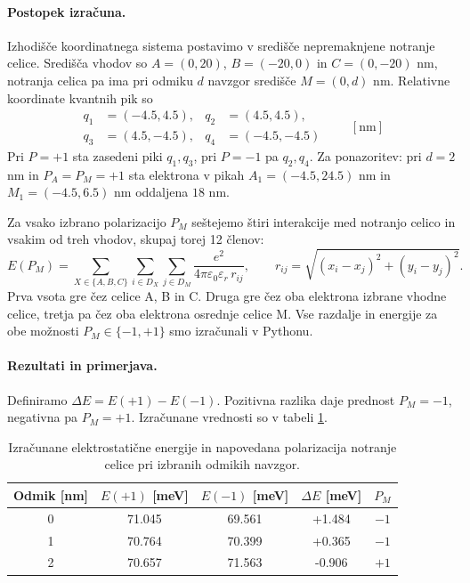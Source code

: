 \documentclass[12pt,a4paper]{article}
\begin{document}
\paragraph{Postopek izračuna.}

Izhodišče koordinatnega sistema postavimo v središče nepremaknjene notranje celice. Središča vhodov so $A=(0,20)$, $B=(-20,0)$ in $C=(0,-20)$ nm, notranja celica pa ima pri odmiku $d$ navzgor središče $M=(0,d)$ nm. Relativne koordinate kvantnih pik so
\[
\begin{aligned}
q_1 &= (-4.5, 4.5),  & q_2 &= (4.5, 4.5), \\
q_3 &= (4.5, -4.5), & q_4 &= (-4.5, -4.5)
\end{aligned}
\qquad \mathrm{[nm]}
\]
Pri $P=+1$ sta zasedeni piki $q_1,q_3$, pri $P=-1$ pa $q_2,q_4$. Za ponazoritev: pri $d=2$ nm in $P_A=P_M=+1$ sta elektrona v pikah $A_1=(-4.5,24.5)$ nm in $M_1=(-4.5,6.5)$ nm oddaljena $18$ nm.

Za vsako izbrano polarizacijo $P_M$ seštejemo štiri interakcije med notranjo celico in vsakim od treh vhodov, skupaj torej 12 členov:
\begin{equation}
E(P_M)=\sum_{X\in\{A,B,C\}}\sum_{i\in D_X}\sum_{j\in D_M}
\frac{e^2}{4\pi\varepsilon_0\varepsilon_r\,r_{ij}},\qquad
r_{ij}=\sqrt{(x_i-x_j)^2+(y_i-y_j)^2}.
\end{equation}
Prva vsota gre čez celice A, B in C. Druga gre čez oba elektrona izbrane vhodne celice, tretja pa čez oba elektrona osrednje celice M. Vse razdalje in energije za obe možnosti $P_M\in\{-1,+1\}$ smo izračunali v Pythonu.

\paragraph{Rezultati in primerjava.}

Definiramo $\Delta E=E(+1)-E(-1)$. Pozitivna razlika daje prednost $P_M=-1$, negativna pa $P_M=+1$. Izračunane vrednosti so v tabeli \ref{g18:tab:izracun-energij}.

\begin{table}[H]
    \centering
    \caption{Izračunane elektrostatične energije
    in napovedana polarizacija notranje celice
    pri izbranih odmikih navzgor.}
    \label{g18:tab:izracun-energij}
    \begin{tabular}{ccccc}
        \toprule
        Odmik [nm] &
        $E(+1)$ [meV] &
        $E(-1)$ [meV] &
        $\Delta E$ [meV] &
        $P_M$ \\
        \midrule
        0 & 71.045 & 69.561 & +1.484 & $-1$ \\
        1 & 70.764 & 70.399 & +0.365 & $-1$ \\
        2 & 70.657 & 71.563 & -0.906 & $+1$ \\
        \bottomrule
    \end{tabular}
\end{table}
\end{document}
